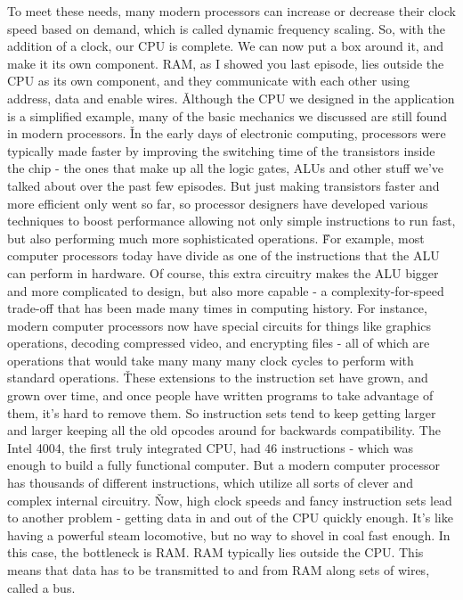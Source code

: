 To meet these needs, many modern processors can increase or decrease their clock speed based on demand, which is
called dynamic frequency scaling. So, with the addition of a clock, our CPU is complete. We can now put a box around
it, and make it its own component. RAM, as I showed you last episode, lies outside the CPU as its own component, and
they communicate with each other using address, data and enable wires. \v

Although the CPU we designed in the application is a simplified example, many of the basic mechanics we discussed are
still found in modern processors. \v

In the early days of electronic computing, processors were typically made faster by improving the switching time of
the transistors inside the chip - the ones that make up all the logic gates, ALUs and other stuff we've talked about
over the past few episodes. But just making transistors faster and more efficient only went so far, so processor
designers have developed various techniques to boost performance allowing not only simple instructions to run fast,
but also performing much more sophisticated operations. \v

For example, most computer processors today have divide as one of the instructions that the ALU can perform in
hardware. Of course, this extra circuitry makes the ALU bigger and more complicated to design, but also more capable
- a complexity-for-speed trade-off that has been made many times in computing history. For instance, modern computer
processors now have special circuits for things like graphics operations, decoding compressed video, and encrypting
files - all of which are operations that would take many many many clock cycles to perform with standard operations. \v

These extensions to the instruction set have grown, and grown over time, and once people have written programs to
take advantage of them, it's hard to remove them. So instruction sets tend to keep getting larger and larger keeping
all the old opcodes around for backwards compatibility. The Intel 4004, the first truly integrated CPU, had 46
instructions - which was enough to build a fully functional computer. But a modern computer processor has thousands
of different instructions, which utilize all sorts of clever and complex internal circuitry. \v

Now, high clock speeds and fancy instruction sets lead to another problem - getting data in and out of the CPU
quickly enough. It's like having a powerful steam locomotive, but no way to shovel in coal fast enough. In this case,
the bottleneck is RAM. RAM typically lies outside the CPU. This means that data has to be transmitted to and from RAM
along sets of wires, called a bus.

